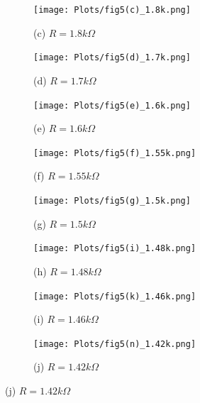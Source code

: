 \documentclass[12pt]{article}
\begin{document}
\begin{figure}[H] %
	\centering
	\begin{subfigure}[b]{0.5\textwidth}
		\centering
		\texttt{[image: Plots/fig5(c)\_1.8k.png]}
		\caption{(c) $R=1.8k\Omega$}
	\end{subfigure}%
	\begin{subfigure}[b]{0.5\textwidth}
		\centering
		\texttt{[image: Plots/fig5(d)\_1.7k.png]}
		\caption{(d) $R=1.7k\Omega$}
	\end{subfigure}
	\begin{subfigure}[b]{0.5\textwidth}
		\centering
		\texttt{[image: Plots/fig5(e)\_1.6k.png]}
		\caption{(e) $R=1.6k\Omega$}
	\end{subfigure}%
	\begin{subfigure}[b]{0.5\textwidth}
		\centering
		\texttt{[image: Plots/fig5(f)\_1.55k.png]}
		\caption{(f) $R=1.55k\Omega$}
	\end{subfigure}
	\begin{subfigure}[b]{0.5\textwidth}
		\centering
		\texttt{[image: Plots/fig5(g)\_1.5k.png]}
		\caption{(g) $R=1.5k\Omega$}
	\end{subfigure}%
	\begin{subfigure}[b]{0.5\textwidth}
		\centering
		\texttt{[image: Plots/fig5(i)\_1.48k.png]}
		\caption{(h) $R=1.48k\Omega$}
	\end{subfigure}
	\begin{subfigure}[b]{0.5\textwidth}
		\centering
		\texttt{[image: Plots/fig5(k)\_1.46k.png]}
		\caption{(i) $R=1.46k\Omega$}
	\end{subfigure}%
	\begin{subfigure}[b]{0.5\textwidth}
		\centering
		\texttt{[image: Plots/fig5(n)\_1.42k.png]}
		\caption{(j) $R=1.42k\Omega$}
	\end{subfigure}
\end{figure}
%
\end{document}
